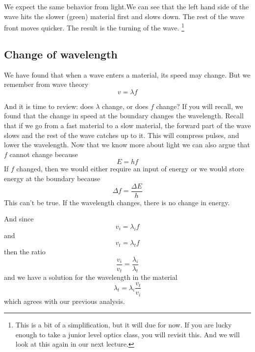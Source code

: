 \documentclass{article}
\begin{document}
We expect the same behavior from light.We can see that the left hand
side of the wave hits the slower (green) material first and slows down. The
rest of the wave front moves quicker. The result is the turning of the wave.%
\footnote{%
This is a bit of a simplification, but it will due for now. If you are lucky
enough to take a junior level optics class, you will revisit this. And we
will look at this again in our next lecture.}

\subsection{Change of wavelength}

We have found that when a wave enters a material, its speed may change. But
we remember from wave theory%
\begin{equation}
v=\lambda f
\end{equation}

And it is time to review: does $\lambda $ change, or does $f$ change? If you
will recall, we found that the change in speed at the boundary changes the
wavelength. Recall that if we go from a fast material to a slow material,
the forward part of the wave slows and the rest of the wave catches up to
it. This will compress pulses, and
lower the wavelength. Now that we know more about light we can also argue
that $f$ cannot change because 
\[
E=hf
\]%
If $f$ changed, then we would either require an input of energy or we would
store energy at the boundary because%
\[
\Delta f=\frac{\Delta E}{h}
\]%
This can't be true. If the wavelength changes, there is no change in energy.

And since 
\[
v_{i}=\lambda _{i}f
\]%
and 
\[
v_{t}=\lambda _{t}f
\]%
then the ratio%
\[
\frac{v_{i}}{v_{t}}=\frac{\lambda _{i}}{\lambda _{t}}
\]%
and we have a solution for the wavelength in the material%
\[
\lambda _{t}=\lambda _{i}\frac{v_{t}}{v_{i}}
\]%
which agrees with our previous analysis.
\end{document}

